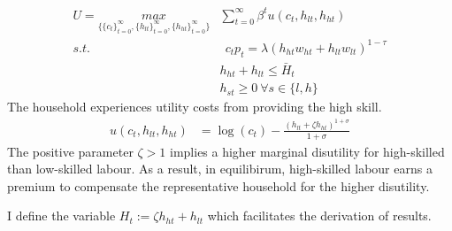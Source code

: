 \begin{align}
U=\underset{\{\{c_{t}\}_{t=0}^{\infty}, \{h_{lt}\}_{t=0}^{\infty}, \{h_{ht}\}_{t=0}^{\infty}\}}{max}&
\sum_{t=0}^{\infty}\beta^t u(c_{t}, h_{lt}, h_{ht})\\
s.t.& \ \ c_{t}p_{t}=%
\lambda \left(h_{ht}w_{ht}+h_{lt}w_{lt}\right)^{1-\tau}\\
\ & h_{ht}+h_{lt}\leq \bar{H}_t\\
\ & h_{st}\geq 0 \ \forall s\in \{l,h\}
\end{align}
The household experiences utility costs from  providing the high skill.
\begin{align}
	u(c_{t}, h_{lt}, h_{ht})&= %
	\log(c_t)-\frac{(h_{lt}+\zeta h_{ht})^{1+\sigma}}{1+\sigma}%
\end{align}
The positive parameter $\zeta>1$ implies a higher marginal disutility for high-skilled than low-skilled labour. As a result, in equilibirum,  
high-skilled labour earns a premium to compensate the representative household for the higher disutility. %


I define the variable $H_t:=\zeta h_{ht}+h_{lt}$ which facilitates the derivation of results. 


